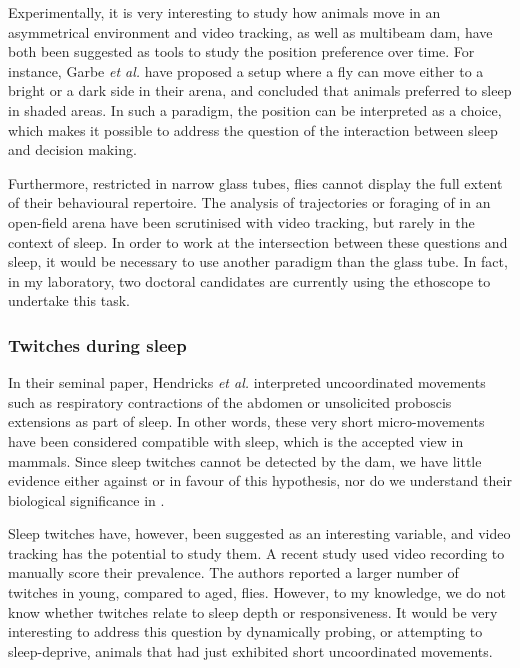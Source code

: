 Experimentally, it is very interesting to study how animals move in an asymmetrical environment and 
video tracking, as well as multibeam \gls{dam}, have both been suggested as tools to study the position preference over time.
For instance, Garbe \emph{et al.} have proposed a setup where a fly can move either to a bright or a dark side in their arena, and concluded that animals preferred to sleep in shaded areas\cite{garbe_context-specific_2015}.
In such a paradigm, the position can be interpreted as a choice, which makes it possible to address the question of the interaction between sleep and decision making.

Furthermore, restricted in narrow glass tubes, flies cannot display the full extent of their behavioural repertoire.
The analysis of trajectories\cite{martin_portrait_2004} or foraging\cite{zaninovich_single-fly_2013} of \droso{} in an open-field arena have been scrutinised with video tracking, but rarely in the context of sleep.
In order to work at the intersection between these questions and sleep, it would be necessary to
use another paradigm than the glass tube.
In fact, in my laboratory, two doctoral candidates are currently using the ethoscope to undertake this task.

\subsubsection{Twitches during sleep}
In their seminal paper, Hendricks \emph{et al.} interpreted uncoordinated movements such as respiratory contractions of the abdomen or unsolicited proboscis extensions as part of sleep\cite{hendricks_need_2000}. 
In other words, these very short micro-movements have been considered compatible with sleep, which is the accepted view in mammals\cite{blumberg_spatiotemporal_2013}.
Since sleep twitches cannot be detected by the \gls{dam}, we have little evidence either against or in favour of this hypothesis, nor do we understand their biological significance in \droso{}.

Sleep twitches have, however, been suggested as an interesting variable, and video tracking has the potential to study them\cite{zimmerman_video_2008}.
A recent study used video recording to manually score their prevalence\cite{dilley_behavioral_2018}.
The authors reported a larger number of twitches in young, compared to aged, flies.
However, to my knowledge, we do not know whether twitches relate to sleep depth or responsiveness.
It would be very interesting to address this question by dynamically probing, or attempting to sleep-deprive, animals that had just exhibited short uncoordinated movements.

